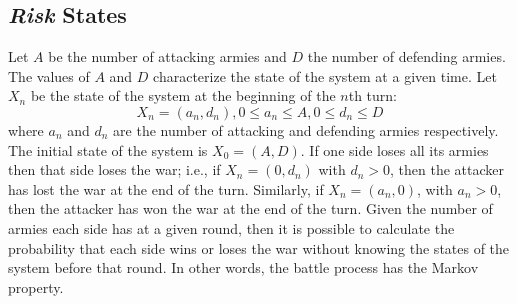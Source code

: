 \documentclass[12pt]{article}
\begin{document}
\subsection*{\emph{Risk} States}

Let \( A \) be the number of attacking armies and \( D \) the number of
defending armies.  The values of \( A \) and \( D \) characterize the
state of the system at a given time.  Let \( X_n \) be the state of the
system at the beginning of the \( n \)th turn:
\[
    X_n = (a_n, d_n), 0 \le a_n \le A, 0 \le d_n \le D
\] where \( a_n \) and \( d_n \) are the number of attacking and
defending armies respectively.  The initial state of the system is \( X_0
= (A, D) \).  If one side loses all its armies then that side loses the
war; i.e., if \( X_n= (0, d_n) \) with \( d_n > 0 \), then the attacker
has lost the war at the end of the turn.  Similarly, if \( X_n= (a_n ,0)
\), with \( a_n > 0 \), then the attacker has won the war at the end of
the turn.  Given the number of armies each side has at a given round,
then it is possible to calculate the probability that each side wins or
loses the war without knowing the states of the system before that
round.  In other words, the battle process has the Markov property.
\end{document}
